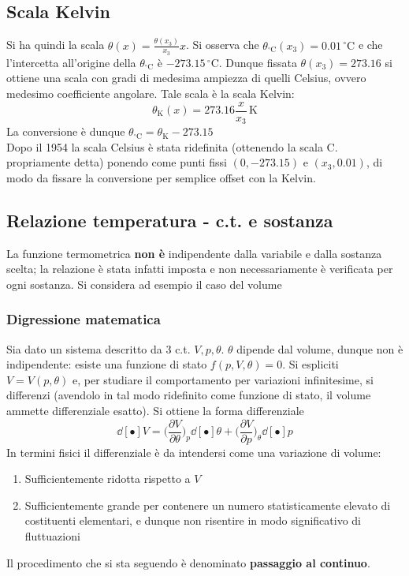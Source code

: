 \documentclass[10pt, oneside]{book}
\begin{document}
\subsection{Scala Kelvin}
Si ha quindi la scala $\displaystyle \theta(x) = \frac{\theta(x_3)}{x_3} x$. Si osserva che $\theta_{\mathrm{{}^\circ C}} (x_3) = 0.01 \, \mathrm{{}^\circ C}$ e che l'intercetta all'origine della $\displaystyle \theta_{\mathrm{{}^\circ C}}$ è $\displaystyle -273.15 \, \mathrm{{}^\circ C}$. Dunque fissata $ \theta(x_3) = 273.16$ si ottiene una scala con gradi di medesima ampiezza di quelli Celsius, ovvero medesimo coefficiente angolare. Tale scala è la scala Kelvin:
\[\theta_{\mathrm{K}} (x) = 273.16\frac{x}{x_3} \, \mathrm{K}\]
La conversione è dunque $\displaystyle \theta_{\mathrm{{}^\circ C}} = \theta_{\mathrm{K}} - 273.15$
\\Dopo il 1954 la scala Celsius è stata ridefinita (ottenendo la scala C. propriamente detta) ponendo come punti fissi $(0, -273.15)$ e $(x_3, 0.01)$, di modo da fissare la conversione per semplice offset con la Kelvin.

\subsection{Relazione temperatura - c.t. e sostanza}
La funzione termometrica \textbf{non è} indipendente dalla variabile e dalla sostanza scelta; la relazione è stata infatti imposta e non necessariamente è verificata per ogni sostanza. Si considera ad esempio il caso del volume

\subsubsection*{Digressione matematica} 
Sia dato un sistema descritto da 3 c.t. $V, p, \theta$. $\theta$ dipende dal volume, dunque non è indipendente: esiste una funzione di stato $f (p,V,\theta) = 0$. Si espliciti $V = V(p, \theta)$ e, per studiare il comportamento per variazioni infinitesime, si differenzi (avendolo in tal modo ridefinito come funzione di stato, il volume ammette differenziale esatto). Si ottiene la forma differenziale
\[\dd[•]{V} = \bigg(\frac{\partial V}{\partial \theta}\bigg)_p \dd[•]{\theta} + \bigg(\frac{\partial V}{\partial p}\bigg)_\theta \dd[•]{p}\]
In termini fisici il differenziale è da intendersi come una variazione di volume:
\begin{enumerate}
\item Sufficientemente ridotta rispetto a $V$
\item Sufficientemente grande per contenere un numero statisticamente elevato di costituenti elementari, e dunque non risentire in modo significativo di fluttuazioni
\end{enumerate}
Il procedimento che si sta seguendo è denominato \textbf{passaggio al continuo}.
\end{document}

